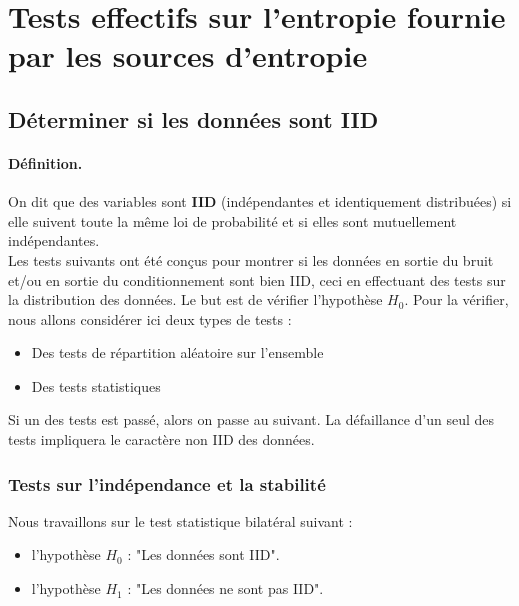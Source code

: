 \section{Tests effectifs sur l'entropie fournie par les sources d'entropie}

\subsection{Déterminer si les données sont IID}

\paragraph{Définition.\\}
On dit que des variables sont \textbf{IID} (indépendantes et identiquement distribuées) si elle suivent toute la même loi de probabilité et si elles sont mutuellement indépendantes. \\

Les tests suivants ont été conçus pour montrer si les données en sortie du bruit et/ou en sortie du conditionnement sont bien IID, ceci en effectuant des tests sur la distribution des données. Le but est de vérifier l'hypothèse $H_0$. Pour la vérifier, nous allons considérer ici deux types de tests : 
\begin{itemize}
\item Des tests de répartition aléatoire sur l'ensemble
\item Des tests statistiques\\
\end{itemize}

Si un des tests est passé, alors on passe au suivant. La défaillance d'un seul des tests impliquera le caractère non IID des données. 


\subsubsection{Tests sur l'indépendance et la stabilité}
Nous travaillons sur le test statistique bilatéral suivant : 
\begin{itemize}
\item l'hypothèse $H_0$ : "Les données sont IID". 
\item l'hypothèse $H_1$ : "Les données ne sont pas IID". \\

\end{itemize}


